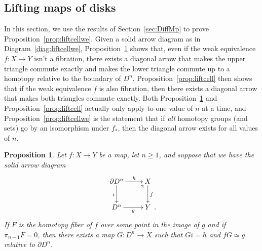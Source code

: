 \documentclass{amsart}
\numberwithin{equation}{section}
\theoremstyle{slplain}
\newtheorem{prop}[equation]{Proposition}
\theoremstyle{definition}
\theoremstyle{remark}
\newcommand{\propref}{Proposition~\ref}
\newcommand{\diagref}{Diagram~\ref}
\newcommand{\secref}{Section~\ref}
\newcommand{\bdry}{\partial}
\newcommand{\homotopic}{\simeq}
\newcommand{\Period}{\rlap{\enspace .}}
\begin{document}
\subsection{Lifting maps of disks}
\label{sec:LiftDisks}

In this section, we use the results of \secref{sec:DiffMp} to prove
\propref{prop:liftcellwe}.  Given a solid arrow diagram as in
\diagref{diag:liftcellwe}, \propref{prop:lift} shows that, even if the
weak equivalence $f\colon X \to Y$ isn't a fibration, there exists a
diagonal arrow that makes the upper triangle commute exactly and makes
the lower triangle commute up to a homotopy relative to the boundary
of $D^{n}$.  \propref{prop:liftcell} then shows that if the weak
equivalence $f$ is also fibration, then there exists a diagonal arrow
that makes both triangles commute exactly.  Both \propref{prop:lift}
and \propref{prop:liftcell} actually only apply to one value of $n$ at
a time, and \propref{prop:liftcellwe} is the statement that if
\emph{all} homotopy groups (and sets) go by an isomorphism under
$f_{*}$, then the diagonal arrow exists for all values of $n$.

\begin{prop}
  \label{prop:lift}
  Let $f\colon X \to Y$ be a map, let $n \ge 1$, and suppose that we
  have the solid arrow diagram
  \begin{displaymath}
    \xymatrix{
      {\bdry D^{n}} \ar[r]^-{h} \ar[d]_{i}
      & {X} \ar[d]^{f}\\
      {D^{n}} \ar[r]_-{g} \ar@{..>}[ur]
      & {Y \Period}
    }
  \end{displaymath}
  If $F$ is the homotopy fiber of $f$ over some point in the image of
  $g$ and if $\pi_{n-1}F = 0$, then there exists a map $G\colon D^{n}
  \to X$ such that $Gi = h$ and $fG \homotopic g$ relative to
  $\bdry D^{n}$.
\end{prop}
\end{document}

